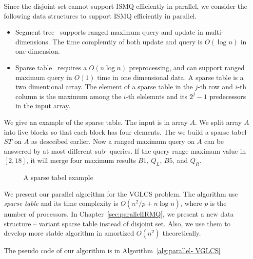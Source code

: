 Since the disjoint set cannot support ISMQ efficiently in parallel, we
consider the following data structures to support ISMQ efficiently in
parallel.

\begin{itemize}
  \item Segment tree~\cite{berg2000computational} supports ranged
    maximum query and update in multi-dimensions.  The time complemtiy
    of both update and query is $O(\log n)$ in one-dimension.
  \item Sparse table~\cite{Berkman1993RecursiveSP} requires a $O(n
    \log n)$ preprocessing, and can support ranged maximum query in
    $O(1)$ time in one dimensional data.  A sparse table is a two
    dimentional array.  The element of a sparse table in the $j$-th
    row and $i$-th column is the maximum among the $i$-th elelemnts
    and its $2^j - 1$ predecessors in the input array.
\end{itemize}

We give an example of the sparse table.  The input is in array $A$. We
split array $A$ into five blocks so that each block has four elements.
The we build a sparse tabel $ST$ on $A$ as desceibed earlier.  Now a
ranged maximum query on $A$ can be answered by at most  different sub-
queries.  If the query range maximum value in $[2, 18]$, it will merge
four maximum results $B1$, $Q_L$, $B5$, and $Q_R$.
    
\begin{figure*}[!thb]
  \centering {} 
  \caption{A sparse tabel example}
  \label{fig:interval-decomposition}
\end{figure*}

We present our parallel algorithm for the VGLCS problem.  The algorithm
use {\em sparse table} and its time complexity is $O(n^2 / p + n \log
n)$, where $p$ is the number of processors.  In
Chapter~\ref{sec:parallelIRMQ}, we present a new data structure --
variant sparse table instead of disjoint set.  Also, we use them to
develop more stable algorithm in amortized $O(n^2)$ theoretically.


The pseudo code of our algorithm is in Algorithm~\ref{alg:parallel-
VGLCS}

\iffalse 稀疏表是我們認為最好的替代方案，其整合後為 VGLCS 平行算法
\ref{alg:parallel-VGLCS}，算法的時間複雜度為 $O(n^2 / p + n \log n)$，
其中 $p$ 為處理器個數。在後續的章節，我們將提出新的數據結構取代并查集操
作，且能在平行算法達到理想複雜度 $O(n^2 / p + n \log n)$。\fi


